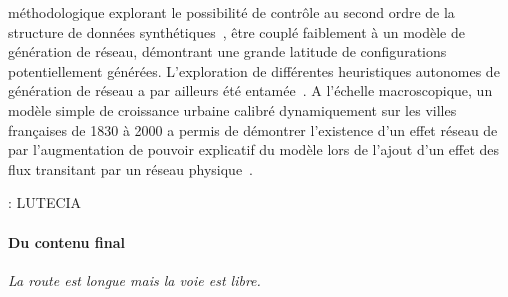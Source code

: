 méthodologique explorant le possibilité de contrôle au second ordre de la structure de données synthétiques~\cite{raimbault2016generation}, être couplé faiblement à un modèle de génération de réseau, démontrant une grande latitude de configurations potentiellement générées. L'exploration de différentes heuristiques autonomes de génération de réseau a par ailleurs été entamée~\cite{raimbault2015labex}. A l'échelle macroscopique, un modèle simple de croissance urbaine calibré dynamiquement sur les villes françaises de 1830 à 2000 a permis de démontrer l'existence d'un effet réseau de par l'augmentation de pouvoir explicatif du modèle lors de l'ajout d'un effet des flux transitant par un réseau physique~\cite{raimbault2016models}.


\cite{le2015modeling} : LUTECIA


\cite{antelope2016interdisciplinary}

\cite{raimbault2016discrepancy}
\cite{raimbault2016investigating}
\cite{serra2016game}






\paragraph{Du contenu final}

%
%
%


\emph{La route est longue mais la voie est libre.}












